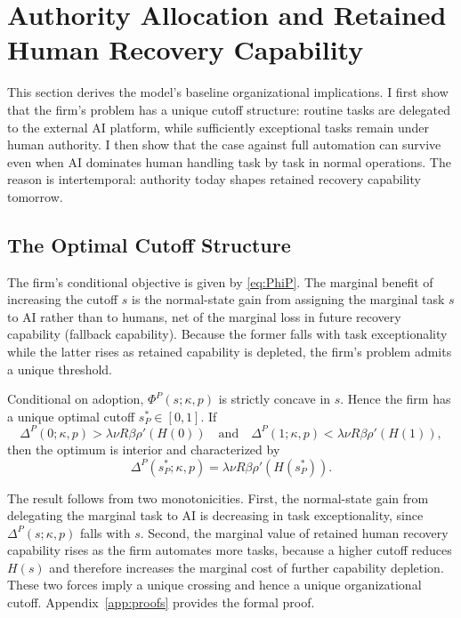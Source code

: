 \section{Authority Allocation and Retained Human Recovery Capability}
\label{sec:baseline}

This section derives the model's baseline organizational implications. I first show that the firm's problem has a unique cutoff structure: routine tasks are delegated to the external AI platform, while sufficiently exceptional tasks remain under human authority. I then show that the case against full automation can survive even when AI dominates human handling task by task in normal operations. The reason is intertemporal: authority today shapes retained recovery capability tomorrow.

\subsection{The Optimal Cutoff Structure}
\label{subsec:cutoff}

The firm's conditional objective is given by \eqref{eq:PhiP}. The marginal benefit of increasing the cutoff $s$ is the normal-state gain from assigning the marginal task $s$ to AI rather than to humans, net of the marginal loss in future recovery capability (fallback capability). Because the former falls with task exceptionality while the latter rises as retained capability is depleted, the firm's problem admits a unique threshold.

\begin{proposition}
\label{prop:cutoff}
Conditional on adoption, $\Phi^P(s;\kappa,p)$ is strictly concave in $s$. Hence the firm has a unique optimal cutoff $s_P^\ast\in[0,1]$. If
\[
\Delta^P(0;\kappa,p)>\lambda \nu R \beta \rho'(H(0))
\quad\text{and}\quad
\Delta^P(1;\kappa,p)<\lambda \nu R \beta \rho'(H(1)),
\]
then the optimum is interior and characterized by
\begin{equation}
\label{eq:FOC-private-baseline}
\Delta^P(s_P^\ast;\kappa,p)=\lambda \nu R \beta \rho'(H(s_P^\ast)).
\end{equation}
\end{proposition}

The result follows from two monotonicities. First, the normal-state gain from delegating the marginal task to AI is decreasing in task exceptionality, since $\Delta^P(s;\kappa,p)$ falls with $s$. Second, the marginal value of retained human recovery capability rises as the firm automates more tasks, because a higher cutoff reduces $H(s)$ and therefore increases the marginal cost of further capability depletion. These two forces imply a unique crossing and hence a unique organizational cutoff. Appendix~\ref{app:proofs} provides the formal proof.

